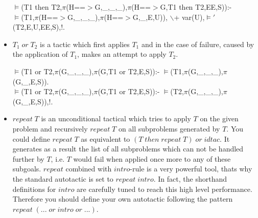 \documentclass[11pt]{report}
\makeatletter
\newcommand{\ulinv}[1]{\index{#1@\texttt{#1}}}
\makeatother
\begin{document}
\begin{itemize}
\begin{sf}\begin{tabbing}
$\models$(T1 then T2,$\pi$(H==$>$G,\_\hspace{0.1em},\_\hspace{0.1em},\_\hspace{0.1em}),$\pi$(H==$>$G,T1 then T2,EE,S)):- \\[-0.15ex]
\hspace{2em}$\models$(T1,$\pi$(H==$>$G,\_\hspace{0.1em},\_\hspace{0.1em},\_\hspace{0.1em}),$\pi$(H==$>$G,\_\hspace{0.1em},E,U)), $\backslash$+ var(U),$\models'$(T2,E,U,EE,S),!.
\end{tabbing}\end{sf}

   
 \item
 \ulinv{or}
 $T_{1}\; or\; T_{2}$ is a tactic which first applies
 $T_{1}$ and in the case of failure, caused 
 by the application of $T_{1}$,  
 makes an attempt to apply $T_{2}$.
   
\begin{sf}\begin{tabbing}
$\models$(T1 or T2,$\pi$(G,\_\hspace{0.1em},\_\hspace{0.1em},\_\hspace{0.1em}),$\pi$(G,T1 or T2,E,S)):- $\models$(T1,$\pi$(G,\_\hspace{0.1em},\_\hspace{0.1em},\_\hspace{0.1em}),$\pi$(G,\_\hspace{0.1em},E,S)).\\[-0.15ex]
$\models$(T1 or T2,$\pi$(G,\_\hspace{0.1em},\_\hspace{0.1em},\_\hspace{0.1em}),$\pi$(G,T1 or T2,E,S)):- $\models$(T2,$\pi$(G,\_\hspace{0.1em},\_\hspace{0.1em},\_\hspace{0.1em}),$\pi$(G,\_\hspace{0.1em},E,S)),!.
\end{tabbing}\end{sf}

   
 \item
 \ulinv{repeat}
 $repeat\;T$ is an unconditional tactical which tries to apply $T$
 on the given problem and recursively $repeat\;T$ 
 on all subproblems generated by $T$.
 You could define $repeat\;T$ as equivalent to
 $(T\;then\;repeat\;T)\;or\;idtac$.
 It generates as a result the list of all subproblems
 which can not be handled further by $T$, i.e. $T$ would
 fail when applied once more to any of these subgoals. 
 $repeat$ combined with $intro$-rule is a very powerful tool,
 thats why the standard autotactic is set to $repeat\;intro$.
 In fact, the shorthand definitions for $intro$ are carefully tuned
 to reach this high level performance. 
 Therefore you should define your own autotactic following the
 pattern $repeat\;(...\;or\;intro\;or\;...)$.
   

\end{itemize}
\end{document}
